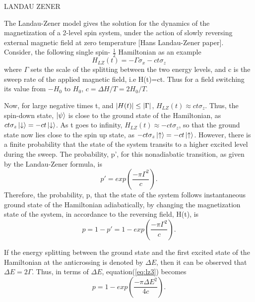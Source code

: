 \documentclass[12]{article}
\begin{document}
\begin{center}
\begin{Huge}
LANDAU ZENER
\end{Huge}
\end{center}
The Landau-Zener model gives the solution for the dynamics of the magnetization of a 2-level spin system, under the action of slowly reversing external magnetic field at zero temperature [Hans Landau-Zener paper]. Consider, the following single spin- $\frac{1}{2}$ Hamiltonian as an example
\begin{equation}
H_{LZ}(t)=-\Gamma \sigma_x -c t \sigma_z \label{eq:n11}
\end{equation}
where $\Gamma$ sets the scale of the splitting between the two energy levels, and c is the sweep rate of the applied magnetic field, i.e H(t)=ct. Thus for a field switching its value from $-H_0$ to $H_0$, $c=\Delta H/T= 2H_0/T$.

Now, for large negative times t, and $\abs{H(t)} \leq \abs{\Gamma}$, $H_{LZ}(t)\approx ct \sigma_z$. Thus, the spin-down state, $\ket{\psi}$ is close to the ground state of the Hamiltonian, as $ct \sigma_z \ket{\downarrow}=-ct \ket{\downarrow}$. As t goes to infinity, $H_{LZ}(t)\approx -ct \sigma_z$, so that the ground state now lies close to the spin up state, as $-ct \sigma_z \ket{\uparrow}=-ct \ket{\uparrow}$. However, there is a finite probability that the state of the system transits to a higher excited level during the sweep. The probability, p', for this nonadiabatic transition, as given by the Landau-Zener formula, is
\begin{equation}
p'=exp(\frac{-\pi {\Gamma}^2}{c}) .   \label{eq:n12}
\end{equation}
Therefore, the probability, p, that the state of the system follows instantaneous ground state of the Hamiltonian adiabatically, by changing the magnetization state of the system, in accordance to the reversing field, H(t), is
\begin{equation}
p=1-p'=1-exp(\frac{-\pi {\Gamma}^2}{c}) .   \label{eq:n13}
\end{equation}

If the energy splitting between the ground state and the first excited state of the Hamiltonian at the anticrossing is denoted by $\Delta E$, then it can be observed that $\Delta E= 2 \Gamma$. Thus, in terms of $\Delta E$, equation(\ref{eq:lz3}) becomes 
\begin{equation}
p=1-exp(\frac{-\pi {\Delta E}^2}{4c}) .   \label{eq:lz3}
\end{equation}
\end{document}
